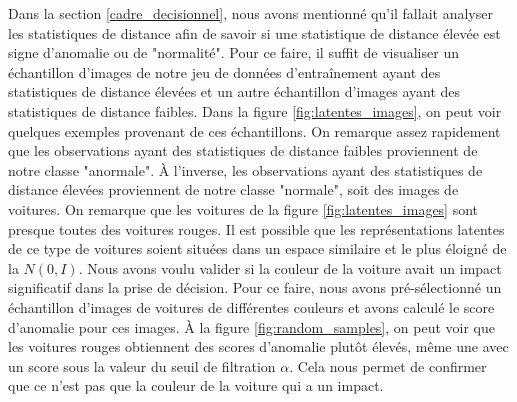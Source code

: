 Dans la section \ref{cadre_decisionnel}, nous avons mentionné qu'il fallait analyser les statistiques de distance afin de savoir si une statistique de distance élevée est signe d'anomalie ou de "normalité". Pour ce faire, il suffit de visualiser un échantillon d'images de notre jeu de données d'entraînement ayant des statistiques de distance élevées et un autre échantillon d'images ayant des statistiques de distance faibles. Dans la figure \ref{fig:latentes_images}, on peut voir quelques exemples provenant de ces échantillons. On remarque assez rapidement que les observations ayant des statistiques de distance faibles proviennent de notre classe "anormale". À l'inverse, les observations ayant des statistiques de distance élevées proviennent de notre classe "normale", soit des images de voitures. On remarque que les voitures de la figure \ref{fig:latentes_images} sont presque toutes des voitures rouges. Il est possible que les représentations latentes de ce type de voitures soient situées dans un espace similaire et le plus éloigné de la $N(0,I)$. Nous avons voulu valider si la couleur de la voiture avait un impact significatif dans la prise de décision. Pour ce faire, nous avons pré-sélectionné un échantillon d'images de voitures de différentes couleurs et avons calculé le score d'anomalie pour ces images. À la figure \ref{fig:random_samples}, on peut voir que les voitures rouges obtiennent des scores d'anomalie plutôt élevés, même une avec un score sous la valeur du seuil de filtration $\alpha$. Cela nous permet de confirmer que ce n'est pas que la couleur de la voiture qui a un impact.

